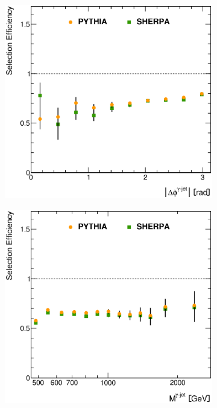 \documentclass[12pt, twoside]{article}
\numberwithin{equation}{section}
\numberwithin{figure}{section}
\newenvironment{changemargin}[2]{%
\begin{list}{}{%
\setlength{\topsep}{0pt}%
\setlength{\leftmargin}{#1}%
\setlength{\rightmargin}{#2}%
\setlength{\listparindent}{\parindent}%
\setlength{\itemindent}{\parindent}%
\setlength{\parsep}{\parskip}%
}%
\item[]}{\end{list}}
\begin{document}
\begin{figure}
\begin{changemargin}{-1.0cm}{-0.75cm}
\begin{changemargin}{-0.75cm}{-1.0cm}
        \vspace{0.2cm}
        \begin{subfigure}[b]{0.37\textwidth}
            \includegraphics[width=\textwidth]{./images/SelectionEfficiencies/EFF-107.eps}
            \subcaption{}
            \label{fig:SelectionEfficienciesPhiPhotonJet}
        \end{subfigure}
        \begin{subfigure}[b]{0.37\textwidth}
            \includegraphics[width=\textwidth]{./images/SelectionEfficiencies/EFF-108.eps}

\end{subfigure}
\end{changemargin}
\end{changemargin}
\end{figure}
\end{document}
